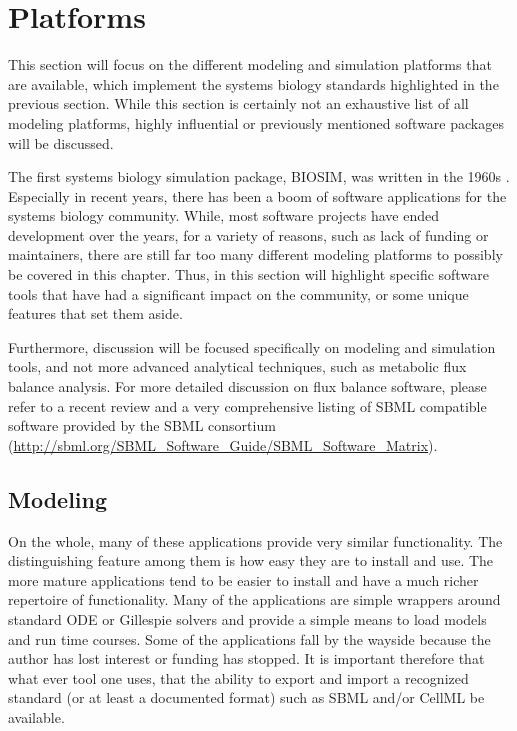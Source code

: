 \section{Platforms}

This section will focus on the different modeling and simulation
platforms that are available, which implement the systems biology
standards highlighted in the previous section. While this section is
certainly not an exhaustive list of all modeling platforms, highly
influential or previously mentioned software packages will be discussed.

The first systems biology simulation package, BIOSIM, was written in the
1960s \autocite{Ga68}. Especially in recent years, there has been a boom
of software applications for the systems biology community. While, most
software projects have ended development over the years, for a variety
of reasons, such as lack of funding or maintainers, there are still far
too many different modeling platforms to possibly be covered in this
chapter. Thus, in this section will highlight specific software tools
that have had a significant impact on the community, or some unique
features that set them aside.

Furthermore, discussion will be focused specifically on modeling and
simulation tools, and not more advanced analytical techniques, such as
metabolic flux balance analysis. For more detailed discussion on flux
balance software, please refer to a recent review
\autocite{copeland2012computational} and a very comprehensive listing of
SBML compatible software provided by the SBML consortium
(\url{http://sbml.org/SBML_Software_Guide/SBML_Software_Matrix}).

\subsection{Modeling}

On the whole, many of these applications provide very similar
functionality. The distinguishing feature among them is how easy they
are to install and use. The more mature applications tend to be easier
to install and have a much richer repertoire of functionality. Many of
the applications are simple wrappers around standard ODE or Gillespie
solvers and provide a simple means to load models and run time courses.
Some of the applications fall by the wayside because the author has lost
interest or funding has stopped. It is important therefore that what
ever tool one uses, that the ability to export and import a recognized
standard (or at least a documented format) such as SBML and/or CellML be
available.

